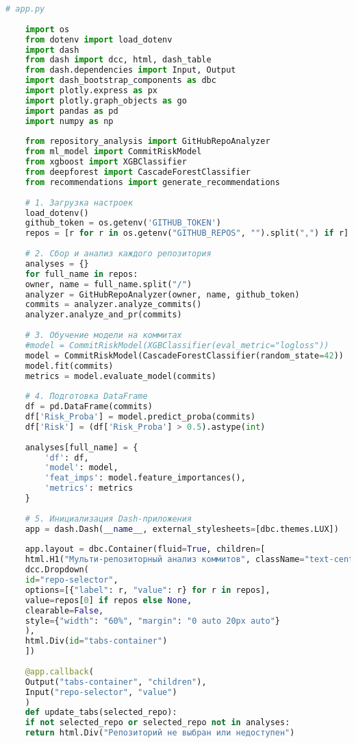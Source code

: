 \begin{lstlisting}[language=Python, caption={{ \texttt{app.py}}}]
	# app.py
	
	import os
	from dotenv import load_dotenv
	import dash
	from dash import dcc, html, dash_table
	from dash.dependencies import Input, Output
	import dash_bootstrap_components as dbc
	import plotly.express as px
	import plotly.graph_objects as go
	import pandas as pd
	import numpy as np
	
	from repository_analysis import GitHubRepoAnalyzer
	from ml_model import CommitRiskModel
	from xgboost import XGBClassifier
	from deepforest import CascadeForestClassifier
	from recommendations import generate_recommendations
	
	# 1. Загрузка настроек
	load_dotenv()
	github_token = os.getenv('GITHUB_TOKEN')
	repos = [r for r in os.getenv("GITHUB_REPOS", "").split(",") if r]
	
	# 2. Сбор и анализ каждого репозитория
	analyses = {}
	for full_name in repos:
	owner, name = full_name.split("/")
	analyzer = GitHubRepoAnalyzer(owner, name, github_token)
	commits = analyzer.analyze_commits()
	analyzer.analyze_and_pr(commits)
	
	# 3. Обучение модели на коммитах
	#model = CommitRiskModel(XGBClassifier(eval_metric="logloss"))
	model = CommitRiskModel(CascadeForestClassifier(random_state=42))
	model.fit(commits)
	metrics = model.evaluate_model(commits)
	
	# 4. Подготовка DataFrame
	df = pd.DataFrame(commits)
	df['Risk_Proba'] = model.predict_proba(commits)
	df['Risk'] = (df['Risk_Proba'] > 0.5).astype(int)
	
	analyses[full_name] = {
		'df': df,
		'model': model,
		'feat_imps': model.feature_importances(),
		'metrics': metrics
	}
	
	# 5. Инициализация Dash-приложения
	app = dash.Dash(__name__, external_stylesheets=[dbc.themes.LUX])
	
	app.layout = dbc.Container(fluid=True, children=[
	html.H1("Мульти-репозиторный анализ коммитов", className="text-center my-4"),
	dcc.Dropdown(
	id="repo-selector",
	options=[{"label": r, "value": r} for r in repos],
	value=repos[0] if repos else None,
	clearable=False,
	style={"width": "60%", "margin": "0 auto 20px auto"}
	),
	html.Div(id="tabs-container")
	])
	
	@app.callback(
	Output("tabs-container", "children"),
	Input("repo-selector", "value")
	)
	def update_tabs(selected_repo):
	if not selected_repo or selected_repo not in analyses:
	return html.Div("Репозиторий не выбран или недоступен")
	

\end{lstlisting}
